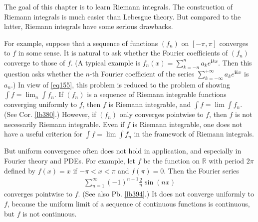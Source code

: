 \documentclass[12pt,b5paper,notitlepage]{article}
\theoremstyle{definition}
\theoremstyle{plain}
\newcommand{\im}{\mathbf{i}}
\newcommand{\Rbb}{\mathbb R}
\newcommand{\eps}{\varepsilon}
\numberwithin{equation}{section}
\begin{document}





The goal of this chapter is to learn Riemann integrals. The construction of Riemann integrals is much easier than Lebesgue theory. But compared to the latter, Riemann integrals have some serious drawbacks. 

For example, suppose that a sequence of functions $(f_n)$ on $[-\pi,\pi]$ converges to $f$ in some sense. It is natural to ask whether the Fourier coefficients of $(f_n)$ converge to those of $f$. (A typical example is $f_n(x)=\sum_{k=-n}^na_k e^{\im kx}$. Then this question asks whether the $n$-th Fourier coefficient of the series $\sum_{k=-\infty}^{+\infty}a_k e^{\im kx}$ is $a_n$.) In view of \eqref{eq155}, this problem is reduced to the problem of showing $\int f=\lim_n\int f_n$. If $(f_n)$ is a sequence of Riemann integrable functions converging uniformly to $f$, then $f$ is Riemann integrable, and $\int f=\lim \int f_n$. (See Cor. \ref{lb380}.) However, if $(f_n)$ only converges pointwise to $f$, then $f$ is not necessarily Riemann integrable. Even if $f$ is Riemann integrable, one does not have a useful criterion for $\int f=\lim \int f_n$ in the framework of Riemann integrals. 

But uniform convergence often does not hold in application, and especially in Fourier theory and PDEs. For example, let $f$ be the function on $\Rbb$ with period $2\pi$ defined by $f(x)=x$ if $-\pi<x<\pi$ and $f(\pi)=0$. Then the Fourier series
\begin{align}
\sum_{n=1}^\infty (-1)^{n-1}\frac 2n\sin(nx) \label{eq194}
\end{align}
converges pointwise to $f$. (See also Pb. \ref{lb394}.) It does not converge uniformly to $f$, because the uniform limit of a sequence of continuous functions is continuous, but $f$ is not continuous.
\end{document}
